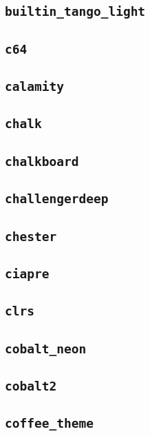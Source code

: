 \subsection{\texttt{builtin\_tango\_light}}
\newpage
\subsection{\texttt{c64}}
\newpage
\subsection{\texttt{calamity}}
\newpage
\subsection{\texttt{chalk}}
\newpage
\subsection{\texttt{chalkboard}}
\newpage
\subsection{\texttt{challengerdeep}}
\newpage
\subsection{\texttt{chester}}
\newpage
\subsection{\texttt{ciapre}}
\newpage
\subsection{\texttt{clrs}}
\newpage
\subsection{\texttt{cobalt\_neon}}
\newpage
\subsection{\texttt{cobalt2}}
\newpage
\subsection{\texttt{coffee\_theme}}
\newpage
